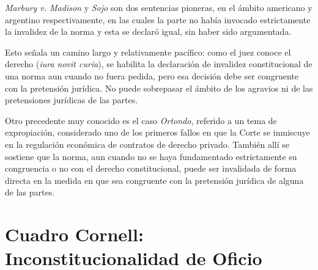 \documentclass[12pt,oneside]{book}
\begin{document}
\textit{Marbury v. Madison} y \textit{Sojo} son dos sentencias pioneras, en el ámbito americano y argentino respectivamente, en las cuales la parte no había invocado estrictamente la invalidez de la norma y esta se declaró igual, sin haber sido argumentada.

Esto señala un camino largo y relativamente pacífico: como el juez conoce el derecho (\textit{iura novit curia}), se habilita la declaración de invalidez constitucional de una norma aun cuando no fuera pedida, pero esa decisión debe ser congruente con la pretensión jurídica. No puede sobrepasar el ámbito de los agravios ni de las pretensiones jurídicas de las partes.

Otro precedente muy conocido es el caso \textit{Ortondo}, referido a un tema de expropiación, considerado uno de los primeros fallos en que la Corte se inmiscuye en la regulación económica de contratos de derecho privado. También allí se sostiene que la norma, aun cuando no se haya fundamentado estrictamente su congruencia o no con el derecho constitucional, puede ser invalidada de forma directa en la medida en que sea congruente con la pretensión jurídica de alguna de las partes.

\section{Cuadro Cornell: Inconstitucionalidad de Oficio}
\end{document}
